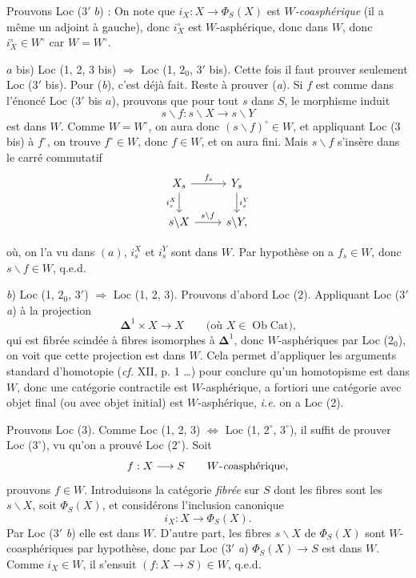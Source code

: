 Prouvons Loc ($3'$ $b$) : On note que $i_X : X \longrightarrow \Phi_S(X)$ est $W$\textit{-coasphérique} (il a même un adjoint à gauche), donc $i_X^\circ$ est $W$-asphérique, donc dans $W$, donc $i_X^\circ \in W^\circ$ car $W = W^\circ$. %

$a$ bis) Loc (1, 2, 3 bis) $\Longrightarrow$ Loc (1, $2_0$, $3'$ bis). Cette fois il faut prouver seulement Loc ($3'$ bis). Pour (\textit{b}), c’est déjà fait. Reste à prouver (\textit{a}). Si $f$ est comme dans l’énoncé Loc ($3'$ bis $a$), prouvons que pour tout $s$ dans $S$, le morphisme induit
\[
s\backslash f : s\backslash X \longrightarrow s\backslash Y
\]
est dans $W$. Comme $W = W^\circ$, on aura donc $(s\backslash f)^\circ \in W$, et appliquant Loc (3 bis) à $f^\circ$, on trouve $f^\circ \in W$, donc $f \in W$, et on aura fini. Mais $s\backslash f$ s’insère dans le carré commutatif
\[
\begin{tikzcd}
X_s \arrow[r, "f_s"] \arrow[d, "i_s^X"'] & Y_s \arrow[d, "i_s^Y"] \\
s\backslash X \arrow[r, "s\backslash f"] & s\backslash Y,
\end{tikzcd}
\]

\setcounter{footnote}{2}

où, on l'a vu dans $(a)$, $i_s^X$ et $i_s^Y$ sont dans $W$. Par hypothèse on a $f_s \in W$, donc $s\backslash f \in W$, q.e.d.

\textit{b}) Loc (1, $2_0$, $3'$) $\Longrightarrow$ Loc (1, 2, 3). Prouvons d'abord Loc (2). Appliquant Loc ($3'$ \textit{a}) à la projection
\[
\boldsymbol{\Delta}^1 \times X \longrightarrow X \qquad \text{(où $X \in \operatorname{Ob}\mathrm{Cat}$),}
\]
qui est fibrée scindée à fibres isomorphes à $\boldsymbol{\Delta}^1$, donc $W$-asphériques par Loc ($2_0$), on voit que cette projection est dans $W$. Cela permet d'appliquer les arguments standard d'homotopie (\textit{cf.} XII, p. 1 \ldots) pour conclure qu'un homotopisme est dans $W$, donc une catégorie contractile est $W$-asphérique, a fortiori une catégorie avec objet final (ou avec objet initial) est $W$-asphérique, \textit{i.e.} on a Loc (2).

Prouvons Loc (3). Comme Loc (1, 2, 3) $\Longleftrightarrow$ Loc (1, $2^\circ$, $3^\circ$), il suffit de prouver Loc ($3^\circ$), vu qu'on a prouvé Loc ($2^\circ$). Soit
\[
f : X \longrightarrow S \qquad \text{$W$-\textit{co}asphérique,}
\]
prouvons $f \in W$. Introduisons la catégorie \textit{fibrée} sur $S$ dont les fibres sont les $s\backslash X$, soit $\Phi_S(X)$, et considérons l'inclusion canonique
\[
i_X : X \longrightarrow \Phi_S(X).
\]
Par Loc ($3'$ \textit{b}) elle est dans $W$. D'autre part, les fibres $s\backslash X$ de $\Phi_S(X)$ sont $W$-coasphériques par hypothèse, donc par Loc ($3'$ \textit{a}) $\Phi_S(X) \longrightarrow S$ est dans $W$. Comme $i_X \in W$, il s'ensuit $(f : X \longrightarrow S) \in W$, q.e.d.

